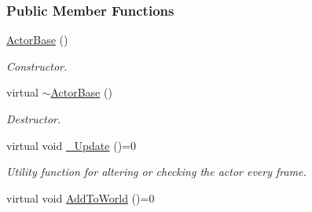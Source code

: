 \subsubsection*{Public Member Functions}
\begin{DoxyCompactItemize}
\item 
\hyperlink{classMezzanine_1_1ActorBase_aa9cc2fce1ff708a96d4a879b87054f18}{ActorBase} ()
\begin{DoxyCompactList}\small\item\em Constructor. \item\end{DoxyCompactList}\item 
virtual \hyperlink{classMezzanine_1_1ActorBase_a0b49f2bc589504c908ccc47a635e1e79}{$\sim$ActorBase} ()
\begin{DoxyCompactList}\small\item\em Destructor. \item\end{DoxyCompactList}\item 
\hypertarget{classMezzanine_1_1ActorBase_a8f5a36a6981f1249dbabab318531afd0}{
virtual void \hyperlink{classMezzanine_1_1ActorBase_a8f5a36a6981f1249dbabab318531afd0}{\_\-Update} ()=0}
\label{classMezzanine_1_1ActorBase_a8f5a36a6981f1249dbabab318531afd0}

\begin{DoxyCompactList}\small\item\em Utility function for altering or checking the actor every frame. \item\end{DoxyCompactList}\item 
\hypertarget{classMezzanine_1_1ActorBase_abe739a46f248a7ba257becfb560d9aa5}{
virtual void \hyperlink{classMezzanine_1_1ActorBase_abe739a46f248a7ba257becfb560d9aa5}{AddToWorld} ()=0}
\label{classMezzanine_1_1ActorBase_abe739a46f248a7ba257becfb560d9aa5}


\end{DoxyCompactItemize}
